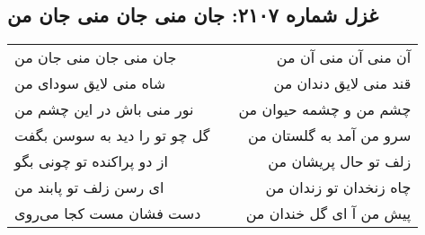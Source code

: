 \begin{center}
\section*{غزل شماره ۲۱۰۷: جان منی جان منی جان من}
\label{sec:2107}
\begin{longtable}{l p{0.5cm} r}
جان منی جان منی جان من
&&
آن منی آن منی آن من
\\
شاه منی لایق سودای من
&&
قند منی لایق دندان من
\\
نور منی باش در این چشم من
&&
چشم من و چشمه حیوان من
\\
گل چو تو را دید به سوسن بگفت
&&
سرو من آمد به گلستان من
\\
از دو پراکنده تو چونی بگو
&&
زلف تو حال پریشان من
\\
ای رسن زلف تو پابند من
&&
چاه زنخدان تو زندان من
\\
دست فشان مست کجا می‌روی
&&
پیش من آ ای گل خندان من
\\
\end{longtable}
\end{center}
